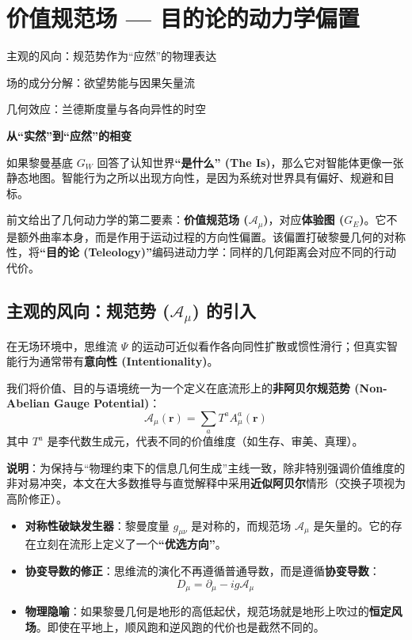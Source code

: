 \chapter{价值规范场 — 目的论的动力学偏置}
\label{chp:value_gauge_field}

\begin{introduction}
    \item 主观的风向：规范势作为“应然”的物理表达
    \item 场的成分分解：欲望势能与因果矢量流
    \item 几何效应：兰德斯度量与各向异性的时空
\end{introduction}

\begin{bquote}
    \textbf{从“实然”到“应然”的相变}

    如果黎曼基底 $G_W$ 回答了认知世界\textbf{“是什么” (The Is)}，那么它对智能体更像一张静态地图。智能行为之所以出现方向性，是因为系统对世界具有偏好、规避和目标。

    前文给出了几何动力学的第二要素：\textbf{价值规范场 ($\mathcal{A}_\mu$)}，对应\textbf{体验图 ($G_E$)}。它不是额外曲率本身，而是作用于运动过程的方向性偏置。该偏置打破黎曼几何的对称性，将\textbf{“目的论 (Teleology)”}编码进动力学：同样的几何距离会对应不同的行动代价。
\end{bquote}

\section{主观的风向：规范势 (\texorpdfstring{$\mathcal{A}_\mu$}{A}) 的引入}
\label{sec:section_6725}

在无场环境中，思维流 $\Psi$ 的运动可近似看作各向同性扩散或惯性滑行；但真实智能行为通常带有\textbf{意向性 (Intentionality)}。


我们将价值、目的与语境统一为一个定义在底流形上的\textbf{非阿贝尔规范势 (Non-Abelian Gauge Potential)}：
$$ \mathcal{A}_\mu(\mathbf{r}) = \sum_a T^a A_\mu^a(\mathbf{r}) $$
其中 $T^a$ 是李代数生成元，代表不同的价值维度（如生存、审美、真理）。

\textbf{说明}：为保持与“物理约束下的信息几何生成”主线一致，除非特别强调价值维度的非对易冲突，本文在大多数推导与直觉解释中采用\textbf{近似阿贝尔}情形（交换子项视为高阶修正）。

\begin{itemize}
    \item \textbf{对称性破缺发生器}：黎曼度量 $g_{\mu\nu}$ 是对称的，而规范场 $\mathcal{A}_\mu$ 是矢量的。它的存在立刻在流形上定义了一个\textbf{“优选方向”}。
    \item \textbf{协变导数的修正}：思维流的演化不再遵循普通导数，而是遵循\textbf{协变导数}：
    $$ D_\mu = \partial_\mu - i g \mathcal{A}_\mu $$
    \item \textbf{物理隐喻}：如果黎曼几何是地形的高低起伏，规范场就是地形上吹过的\textbf{恒定风场}。即使在平地上，顺风跑和逆风跑的代价也是截然不同的。
\end{itemize}

